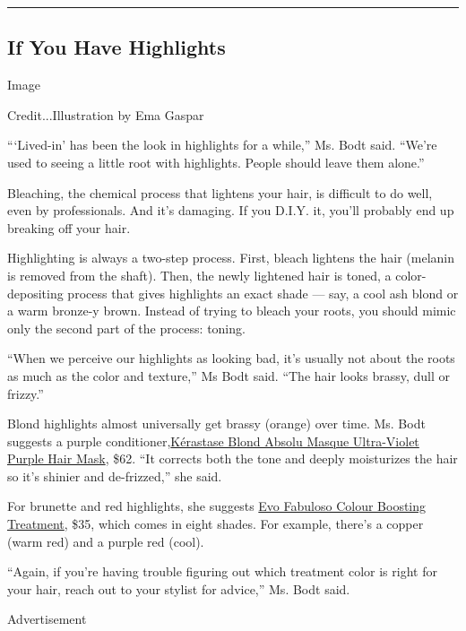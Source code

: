 \begin{center}\rule{0.5\linewidth}{\linethickness}\end{center}

\hypertarget{if-you-have-highlights}{%
\subsection{If You Have Highlights}\label{if-you-have-highlights}}

Image

Credit...Illustration by Ema Gaspar

```Lived-in' has been the look in highlights for a while,'' Ms. Bodt
said. ``We're used to seeing a little root with highlights. People
should leave them alone.''

Bleaching, the chemical process that lightens your hair, is difficult to
do well, even by professionals. And it's damaging. If you D.I.Y. it,
you'll probably end up breaking off your hair.

Highlighting is always a two-step process. First, bleach lightens the
hair (melanin is removed from the shaft). Then, the newly lightened hair
is toned, a color-depositing process that gives highlights an exact
shade --- say, a cool ash blond or a warm bronze-y brown. Instead of
trying to bleach your roots, you should mimic only the second part of
the process: toning.

``When we perceive our highlights as looking bad, it's usually not about
the roots as much as the color and texture,'' Ms Bodt said. ``The hair
looks brassy, dull or frizzy.''

Blond highlights almost universally get brassy (orange) over time. Ms.
Bodt suggests a purple
conditioner,\href{https://www.kerastase-usa.com/collections/blond-absolu/masque-ultra-violet-purple-hair-mask.html}{Kérastase
Blond Absolu Masque Ultra-Violet Purple Hair Mask}, \$62. ``It corrects
both the tone and deeply moisturizes the hair so it's shinier and
de-frizzed,'' she said.

For brunette and red highlights, she suggests
\href{https://www.evohair.com/hair/family-171/fabuloso.html}{Evo
Fabuloso Colour Boosting Treatment}, \$35, which comes in eight shades.
For example, there's a copper (warm red) and a purple red (cool).

``Again, if you're having trouble figuring out which treatment color is
right for your hair, reach out to your stylist for advice,'' Ms. Bodt
said.

Advertisement

